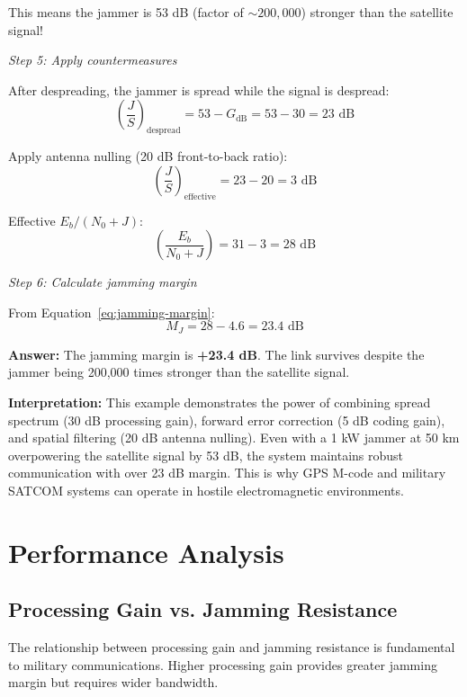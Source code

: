This means the jammer is 53 dB (factor of $\sim 200{,}000$) stronger than the satellite signal!

\textit{Step 5: Apply countermeasures}

After despreading, the jammer is spread while the signal is despread:
\begin{equation}
\left(\frac{J}{S}\right)_{\text{despread}} = 53 - G_{\text{dB}} = 53 - 30 = 23 \text{ dB}
\end{equation}

Apply antenna nulling (20 dB front-to-back ratio):
\begin{equation}
\left(\frac{J}{S}\right)_{\text{effective}} = 23 - 20 = 3 \text{ dB}
\end{equation}

Effective $E_b/(N_0 + J)$:
\begin{equation}
\left(\frac{E_b}{N_0 + J}\right) = 31 - 3 = 28 \text{ dB}
\end{equation}

\textit{Step 6: Calculate jamming margin}

From Equation~\ref{eq:jamming-margin}:
\begin{equation}
M_J = 28 - 4.6 = 23.4 \text{ dB}
\end{equation}

\textbf{Answer:} The jamming margin is \textbf{+23.4 dB}. The link survives despite the jammer being 200,000 times stronger than the satellite signal.

\textbf{Interpretation:} This example demonstrates the power of combining spread spectrum (30 dB processing gain), forward error correction (5 dB coding gain), and spatial filtering (20 dB antenna nulling). Even with a 1 kW jammer at 50 km overpowering the satellite signal by 53 dB, the system maintains robust communication with over 23 dB margin. This is why GPS M-code and military SATCOM systems can operate in hostile electromagnetic environments.

\section{Performance Analysis}

\subsection{Processing Gain vs. Jamming Resistance}

The relationship between processing gain and jamming resistance is fundamental to military communications. Higher processing gain provides greater jamming margin but requires wider bandwidth.

